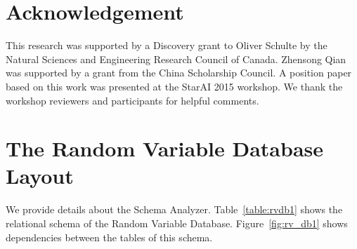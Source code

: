 \documentclass{IEEEtran}
\begin{document}
\section*{Acknowledgement} 
This research was supported by a Discovery grant to Oliver Schulte by the Natural Sciences and Engineering Research Council of Canada. 
Zhensong Qian was supported by a grant from the China Scholarship Council.
A position paper based on this work was presented at the StarAI 2015 workshop. We thank the workshop reviewers and participants for helpful comments.


 

\begin{appendix} \label{sec:appendix}

\section{The Random Variable Database Layout}
We provide details about the Schema Analyzer. Table~\ref{table:rvdb1} shows the relational schema of the Random Variable Database. Figure~\ref{fig:rv_db1} shows dependencies between the tables of this schema. 


\end{appendix}
\end{document}
